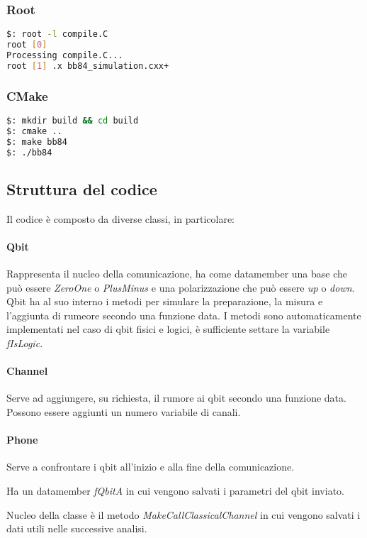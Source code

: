 \documentclass[11 pt, a4paper]{article}
\begin{document}
\subsubsection{Root}
\begin{lstlisting}[language=bash, style=myRoot]
$: root -l compile.C
root [0] 
Processing compile.C...
root [1] .x bb84_simulation.cxx+
\end{lstlisting}

\subsubsection{CMake}
\begin{lstlisting}[language=bash]
$: mkdir build && cd build
$: cmake ..
$: make bb84
$: ./bb84
\end{lstlisting}

\subsection{Struttura del codice}
Il codice è composto da diverse classi, in particolare:
\paragraph{Qbit}
Rappresenta il nucleo della comunicazione, ha come datamember una base che può essere \textit{ZeroOne} o \textit{PlusMinus} e una polarizzazione che può essere \textit{up} o \textit{down}.
Qbit ha al suo interno i metodi per simulare la  preparazione, la misura e l'aggiunta di rumeore secondo una funzione data.
I metodi sono automaticamente implementati nel caso di qbit fisici e logici, è sufficiente settare la variabile \textit{fIsLogic}.

\paragraph{Channel}
Serve ad aggiungere, su richiesta, il rumore ai qbit secondo una funzione data.
Possono essere aggiunti un numero variabile di canali.

\paragraph{Phone}
Serve a confrontare i qbit all'inizio e alla fine della comunicazione.

Ha un datamember \textit{fQbitA} in cui vengono salvati i parametri del qbit inviato.

Nucleo della classe è il metodo \textit{MakeCallClassicalChannel} in cui vengono salvati i dati utili nelle successive analisi.
\end{document}
